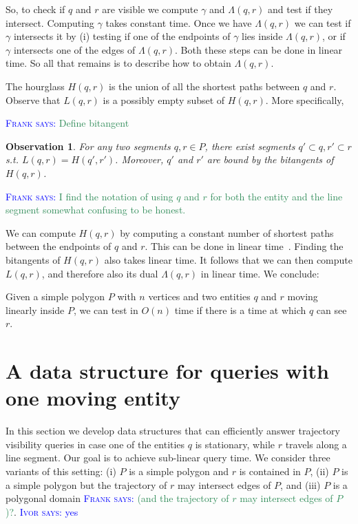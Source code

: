 \documentclass[UKenglish]{lipics-v2019}
\newcommand{\myremark}[4]{\textcolor{blue}{\textsc{#1 #2:}} \textcolor{#4}{\textsf{#3}}}
\newcommand{\frank}[2][says]{\myremark{Frank}{#1}{#2}{SeaGreen}}
\newcommand{\ivor}[2][says]{\myremark{Ivor}{#1}{#2}{Blue}}
\newtheorem{observation}{Observation}
\begin{document}
So, to check if $q$ and $r$ are visible we compute $\gamma$ and $\Lambda(q,r)$
and test if they intersect. Computing $\gamma$ takes constant time. Once we
have $\Lambda(q,r)$ we can test if $\gamma$ intersects it by (i) testing if one
of the endpoints of $\gamma$ lies inside $\Lambda(q,r)$, or if $\gamma$
intersects one of the edges of $\Lambda(q,r)$. Both these steps can be done in
linear time. So all that remains is to describe how to obtain
$\Lambda(q,r)$.

The hourglass $H(q, r)$ is the union of all the shortest paths between $q$ and
$r$. Observe that $L(q,r)$ is a possibly empty subset of $H(q,r)$. More
specifically,

\frank{Define bitangent}

\begin{observation}
  \label{lem:obtain_L}
  For any two segments $q, r \in P$, there exist segments
  $q' \subset q, r' \subset r$ s.t. $L(q, r) = H(q', r')$. Moreover, $q'$ and
  $r'$ are bound by the bitangents of $H(q, r)$.
\end{observation}
\frank{I find the notation of using $q$ and $r$ for both the entity and the
  line segment somewhat confusing to be honest.}

We can compute $H(q,r)$ by computing a constant number of shortest paths
between the endpoints of $q$ and $r$. This can be done in linear
time~\cite{GuibasHLST87}. Finding the bitangents of $H(q,r)$ also takes linear
time. It follows that we can then compute $L(q,r)$, and therefore also its dual
$\Lambda(q,r)$ in linear time. We conclude:

\begin{theorem}
  \label{thm:algorithm_simple_polygon}
  Given a simple polygon $P$ with $n$ vertices and two entities $q$ and $r$
  moving linearly inside $P$, we can test in $O(n)$ time if there is a time at
  which $q$ can see $r$.
\end{theorem}





\section{A data structure for queries with one moving entity}
\label{sec:pointline}

In this section we develop data structures that can efficiently answer
trajectory visibility queries in case one of the entities $q$ is
stationary, while $r$ travels along a line segment. Our goal is to
achieve sub-linear query time. We consider three variants of this
setting: (i) $P$ is a simple polygon and $r$ is contained in $P$, (ii)
$P$ is a simple polygon but the trajectory of $r$ may intersect edges
of $P$, and (iii) $P$ is a polygonal domain \frank{(and the trajectory
  of $r$ may intersect edges of $P$)?}. \ivor{yes}
\end{document}
